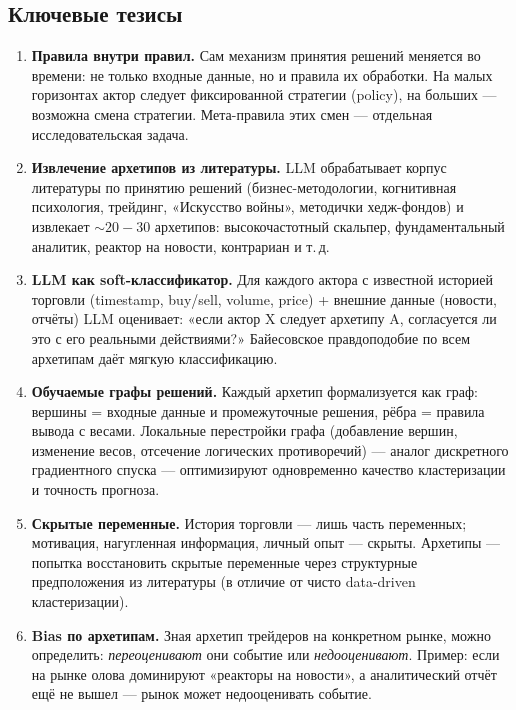 \documentclass[a4paper, 11pt]{article}
\begin{document}
\subsection{Ключевые тезисы}

\begin{enumerate}
  \item \textbf{Правила внутри правил.}
    Сам механизм принятия решений меняется во времени:
    не только входные данные, но и правила их обработки.
    На малых горизонтах актор следует фиксированной стратегии (policy),
    на больших --- возможна смена стратегии.
    Мета-правила этих смен --- отдельная исследовательская задача.

  \item \textbf{Извлечение архетипов из литературы.}
    LLM обрабатывает корпус литературы по принятию решений
    (бизнес-методологии, когнитивная психология, трейдинг,
    «Искусство войны», методички хедж-фондов)
    и извлекает ${\sim}20{-}30$ архетипов:
    высокочастотный скальпер, фундаментальный аналитик,
    реактор на новости, контрариан и т.\,д.

  \item \textbf{LLM как soft-классификатор.}
    Для каждого актора с известной историей торговли
    (timestamp, buy/sell, volume, price) + внешние данные (новости, отчёты)
    LLM оценивает: «если актор X следует архетипу A,
    согласуется ли это с его реальными действиями?»
    Байесовское правдоподобие по всем архетипам
    даёт мягкую классификацию.

  \item \textbf{Обучаемые графы решений.}
    Каждый архетип формализуется как граф:
    вершины = входные данные и промежуточные решения,
    рёбра = правила вывода с весами.
    Локальные перестройки графа (добавление вершин, изменение весов,
    отсечение логических противоречий) --- аналог
    дискретного градиентного спуска --- оптимизируют
    одновременно качество кластеризации и точность прогноза.

  \item \textbf{Скрытые переменные.}
    История торговли --- лишь часть переменных;
    мотивация, нагугленная информация, личный опыт --- скрыты.
    Архетипы --- попытка восстановить скрытые переменные
    через структурные предположения из литературы
    (в отличие от чисто data-driven кластеризации).

  \item \textbf{Bias по архетипам.}
    Зная архетип трейдеров на конкретном рынке,
    можно определить: \emph{переоценивают} они событие или \emph{недооценивают}.
    Пример: если на рынке олова доминируют «реакторы на новости»,
    а аналитический отчёт ещё не вышел --- рынок может недооценивать событие.


\end{enumerate}
\end{document}
